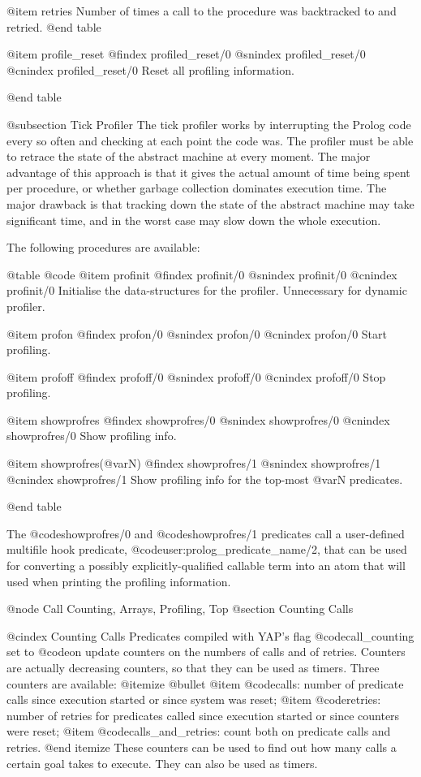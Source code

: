 {{{{{{{@item retries
 Number of times a call to the procedure was backtracked to and retried.
@end table

@item profile_reset
@findex profiled_reset/0
@snindex profiled_reset/0
@cnindex profiled_reset/0
Reset all profiling information.

@end table

@subsection Tick Profiler
The tick profiler works by interrupting the Prolog code every so often
and checking at each point the code was. The profiler must be able to
retrace the state of the abstract machine at every moment. The major
advantage of this approach is that it gives the actual amount of time
being spent per procedure, or whether garbage collection dominates
execution time. The major drawback is that tracking down the state of
the abstract machine may take significant time, and in the worst case
may slow down the whole execution.

The following procedures are available:

@table @code
@item profinit
@findex profinit/0
@snindex profinit/0
@cnindex profinit/0
Initialise the data-structures for the profiler. Unnecessary for
dynamic profiler.

@item profon
@findex profon/0
@snindex profon/0
@cnindex profon/0
Start profiling.

@item profoff
@findex profoff/0
@snindex profoff/0
@cnindex profoff/0
Stop profiling.

@item showprofres
@findex showprofres/0
@snindex showprofres/0
@cnindex showprofres/0
Show profiling info.

@item showprofres(@var{N})
@findex showprofres/1
@snindex showprofres/1
@cnindex showprofres/1
Show profiling info for the top-most @var{N} predicates.

@end table

The @code{showprofres/0} and @code{showprofres/1} predicates call a user-defined multifile hook predicate, @code{user:prolog_predicate_name/2}, that can be used for converting a possibly explicitly-qualified callable term into an atom that will used when printing the profiling information.

@node Call Counting, Arrays, Profiling, Top
@section Counting Calls

@cindex Counting Calls
Predicates compiled with YAP's flag @code{call_counting} set to
@code{on} update counters on the numbers of calls and of
retries. Counters are actually decreasing counters, so that they can be
used as timers.  Three counters are available:
@itemize @bullet
@item @code{calls}: number of predicate calls since execution started or since
system was reset; 
@item @code{retries}: number of retries for predicates called since
execution started or since counters were reset;
@item @code{calls_and_retries}: count both on predicate calls and
retries.
@end itemize
These counters can be used to find out how many calls a certain
goal takes to execute. They can also be used as timers.

}}}}}}}
